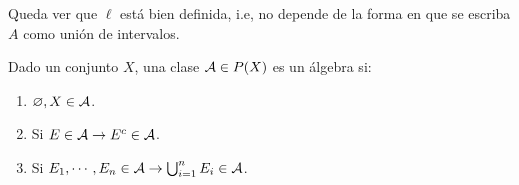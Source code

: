 \begin{note}
    Queda ver que $\ell$ está bien definida, i.e, no depende de la forma en que se escriba $A$ como unión de intervalos.
\end{note}

\begin{definition}[Álgebra]
    Dado un conjunto $X$, una clase $\mathcal{A} \in P(X)$ es un álgebra si: \begin{enumerate}
        \item $\varnothing, X \in \mathcal{A}$.
        \item Si $E \in \mathcal{A} \to E^c \in \mathcal{A}$.
        \item Si $E_1, \cdots, E_n \in \mathcal{A} \to \bigcup_{i = 1}^n E_i \in \mathcal{A}$.
    \end{enumerate}
\end{definition}

